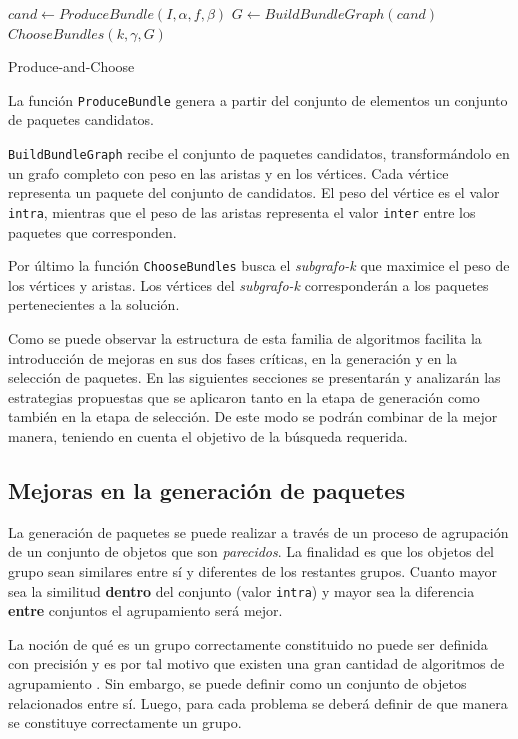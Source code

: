 \begin{center}
	\begin{algorithm}[H]
	\DontPrintSemicolon
	\SetAlgoLined
		$cand \leftarrow ProduceBundle(I,\alpha,f,\beta)$\;
		$G \leftarrow BuildBundleGraph(cand)$\;
		\Return $ChooseBundles(k,\gamma,G)$\;
	\caption{Produce-and-Choose}\label{alg:PAC}
	\end{algorithm}
\end{center}

La función \texttt{ProduceBundle} genera a partir del conjunto de elementos un conjunto de paquetes candidatos.

\texttt{BuildBundleGraph} recibe el conjunto de paquetes candidatos, transformándolo en un grafo completo con peso en las aristas y en los vértices. Cada vértice representa un paquete del conjunto de candidatos. El peso del vértice es el valor \texttt{intra}, mientras que el peso de las aristas representa el valor \texttt{inter} entre los paquetes que corresponden. 

Por último la función \texttt{ChooseBundles} busca el \textit{subgrafo-k} que maximice el peso de los vértices y aristas. Los vértices del \textit{subgrafo-k} corresponderán a los paquetes pertenecientes a la solución.

Como se puede observar la estructura de esta familia de algoritmos facilita la introducción de mejoras en sus dos fases críticas, en la generación y en la selección de paquetes. En las siguientes secciones se presentarán y analizarán las estrategias propuestas que se aplicaron tanto en la etapa de generación como también en la etapa de selección. De este modo se podrán combinar de la mejor manera, teniendo en cuenta el objetivo de la búsqueda requerida.

\subsection{Mejoras en la generación de paquetes}
La generación de paquetes se puede realizar a través de un proceso de agrupación de un conjunto de objetos que son \textit{parecidos}. La finalidad es que los objetos del grupo sean similares entre sí y diferentes de los restantes grupos. Cuanto mayor sea la similitud \textbf{dentro} del conjunto (valor \texttt{intra}) y mayor sea la diferencia \textbf{entre} conjuntos el agrupamiento será mejor.

La noción de qué es un grupo correctamente constituido no puede ser definida con precisión y es por tal motivo que existen una gran cantidad de algoritmos de agrupamiento \cite{Estivill-Castro:2002:WSM:568574.568575}. Sin embargo, se puede definir como un conjunto de objetos relacionados entre sí. Luego, para cada problema se deberá definir de que manera se constituye correctamente un grupo.

